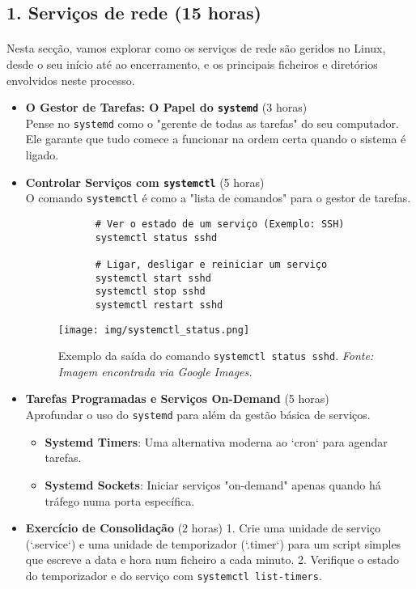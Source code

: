 \documentclass[10pt,a4paper]{article}
\begin{document}
	\subsection*{1. Serviços de rede (15 horas)}
	\vspace{-1.2em}
	\paragraph{}
	Nesta secção, vamos explorar como os serviços de rede são geridos no Linux, desde o seu início até ao encerramento, e os principais ficheiros e diretórios envolvidos neste processo.
	
	\begin{itemize}
		\item \textbf{O Gestor de Tarefas: O Papel do \texttt{systemd}} (3 horas) \\
		Pense no \texttt{systemd} como o "gerente de todas as tarefas" do seu computador. Ele garante que tudo comece a funcionar na ordem certa quando o sistema é ligado.
		
		\item \textbf{Controlar Serviços com \texttt{systemctl}} (5 horas) \\
		O comando \texttt{systemctl} é como a "lista de comandos" para o gestor de tarefas.
		\begin{verbatim}
			# Ver o estado de um serviço (Exemplo: SSH)
			systemctl status sshd
			
			# Ligar, desligar e reiniciar um serviço
			systemctl start sshd
			systemctl stop sshd
			systemctl restart sshd
		\end{verbatim}
		
		\begin{figure}[h]
			\centering
			\texttt{[image: img/systemctl\_status.png]}
			\caption{Exemplo da saída do comando \texttt{systemctl status sshd}. \textit{Fonte: Imagem encontrada via Google Images.}}
			\label{fig:systemctl_status}
		\end{figure}
		
		\item \textbf{Tarefas Programadas e Serviços On-Demand} (5 horas) \\
		Aprofundar o uso do \texttt{systemd} para além da gestão básica de serviços.
		\begin{itemize}
			\item \textbf{Systemd Timers}: Uma alternativa moderna ao `cron` para agendar tarefas.
			\item \textbf{Systemd Sockets}: Iniciar serviços "on-demand" apenas quando há tráfego numa porta específica.
		\end{itemize}
		
		\item \textbf{Exercício de Consolidação} (2 horas)
		1. Crie uma unidade de serviço (`.service`) e uma unidade de temporizador (`.timer`) para um script simples que escreve a data e hora num ficheiro a cada minuto.
		2. Verifique o estado do temporizador e do serviço com \texttt{systemctl list-timers}.
	\end{itemize}
	
\end{document}
